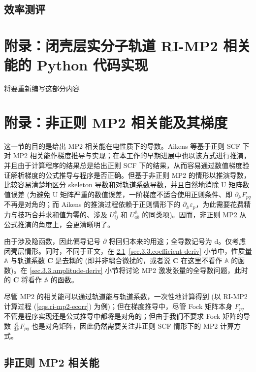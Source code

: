 \subsection{效率测评}

\newpage

\section{附录：闭壳层实分子轨道 RI-MP2 相关能的 Python 代码实现}
\label{sec.3.python-ri-mp2}

\alert{将要重新编写这部分内容}

\section{附录：非正则 MP2 相关能及其梯度}
\label{sec.3.3.non-canonical-mp2-gradient}

这一节的目的是给出 MP2 相关能在电性质下的导数。Aikens 等基于正则 SCF 下对 MP2 相关能作梯度推导与实现\cite{Aikens-Gordon.TCA.2003}；在本工作的早期进展中也以该方式进行推演，并且由于计算程序的结果总是给出正则 SCF 下的结果，从而容易通过数值梯度验证解析梯度的公式推导与程序是否正确。但基于非正则 MP2 的情形以推演导数，比较容易清楚地区分 skeleton 导数和对轨道系数导数，并且自然地消除 U 矩阵数值误差 (为避免 U 矩阵严重的数值误差，一阶梯度不适合使用正则条件、即 $\partial_{\mathbb{A}} F_{pq}$ 不再是对角的；而 Aikens 的推演过程依赖于正则情形下的 $\partial_{\mathbb{A}} \varepsilon_p$，为此需要花费精力与技巧合并求和值为零的、涉及 $U_{ij}^{\mathbb{A}}$ 和 $U_{ab}^{\mathbb{A}}$ 的同类项)。因而，非正则 MP2 从公式推演的角度上，会更清晰明了。

由于涉及隐函数，因此偏导记号 $\partial$ 将回归本来的用途；全导数记号为 $\mathrm{d}$。仅考虑闭壳层情形。同时，不同于正文，在 \ref{sec.3.3.non-canonical}--\ref{sec.3.3.coefficient-deriv} 小节中，性质量 $\mathbb{A}$ 与轨道系数 $\mathbf{C}$ 是去耦的 (即并非耦合微扰的，或者说 $\mathbf{C}$ 在这里不看作 $\mathbb{A}$ 的函数)。在 \ref{sec.3.3.amplitude-deriv} 小节将讨论 MP2 激发张量的全导数问题，此时的 $\mathbf{C}$ 将看作 $\mathbb{A}$ 的函数。

尽管 MP2 的相关能可以通过轨道能与轨道系数，一次性地计算得到 (以 RI-MP2 计算过程 (\ref{eqs.ri-mp2-ecorr}) 为例)；但在梯度推导中，尽管 Fock 矩阵本身 $F_{pq}$ 不管是程序实现还是公式推导中都将是对角的；但由于我们不要求 Fock 矩阵的导数 $\frac{\mathrm{d}}{\mathrm{d} \mathbb{A}} F_{pq}$ 也是对角矩阵，因此仍然需要关注非正则 SCF 情形下的 MP2 计算方式。

\subsection{非正则 MP2 相关能}
\label{sec.3.3.non-canonical}

